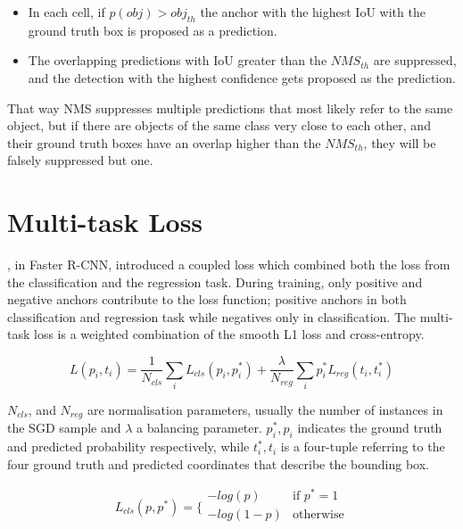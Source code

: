 \begin{itemize}
  \item In each cell, if $p(obj)>obj_{th}$ the anchor with the highest IoU with the ground truth box is proposed as a prediction. 
  \item The overlapping predictions with IoU greater than the $NMS_{th}$ are suppressed, and the detection with the highest confidence gets proposed as the prediction. 
\end{itemize}

That way NMS suppresses multiple predictions that most likely refer to the same object, but if there are objects of the same class very close to each other, and their ground truth boxes have an overlap higher than the $NMS_{th}$, they will be falsely suppressed but one. 

\section{Multi-task Loss} 
\cite{ren2015faster}, in Faster R-CNN, introduced a coupled loss which combined both the loss from the classification and the regression task. During training, only positive and negative anchors contribute to the loss function; positive anchors in both classification and regression task while negatives only in classification.
The multi-task loss is a weighted combination of the smooth L1 loss and cross-entropy.

\begin{equation}
  L(p_i,t_i) = \frac{1}{N_{cls}}\sum_i{L_{cls}(p_i,p_i^*)}+ \frac{\lambda}{N_{reg}}\sum_i p_i^*{L_{reg}(t_i,t_i^*)}
\end{equation} 

$N_{cls}$, and $N_{reg}$ are normalisation parameters, usually the number of instances in the SGD sample and $\lambda$ a balancing parameter. $p_i^*, p_i$ indicates the ground truth and predicted probability respectively, while $t_i^*, t_i$ is a four-tuple referring to the four ground truth and predicted coordinates that describe the bounding box.

\begin{equation}
    L_{cls}(p,p^*)= \bigg\{
    \begin{array}{ll}
      -log(p) & \text{if } p^*=1 \\
      -log(1-p) &  \text{otherwise}\\
    \end{array}
\end{equation}

